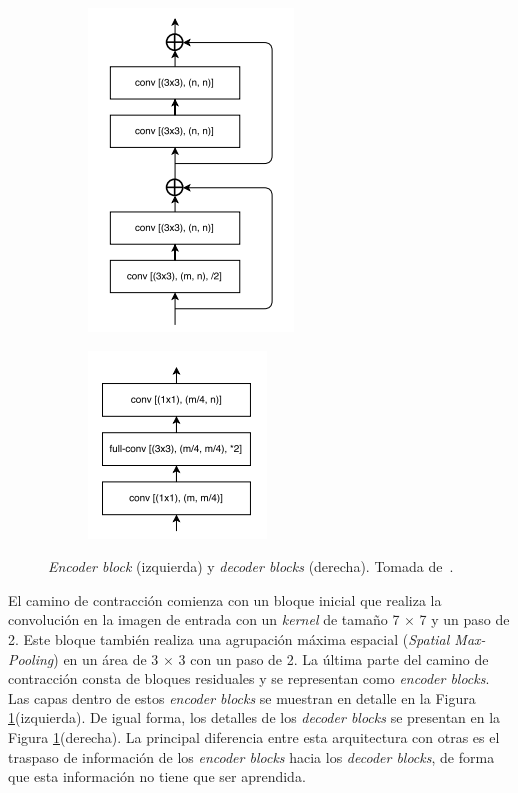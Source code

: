 \begin{figure}[ht]
	\centering
	\begin{subfigure}
		\centering
		\includegraphics[width=.4\linewidth]{./Graphics/encoder.png}
	\end{subfigure}
	\begin{subfigure}
		\centering
		\includegraphics[width=.4\linewidth]{./Graphics/decoder.png}
	\end{subfigure}
	\caption{\textit{Encoder block} (izquierda) y \textit{decoder blocks} (derecha). Tomada de~\cite{chaurasia2017linknet}.}
	\label{fig:blocks}
\end{figure}

El camino de contracción comienza con un bloque inicial que realiza la convolución en la imagen de entrada con un \textit{kernel} de tamaño 7 $\times$ 7 y un paso de 2. Este bloque también realiza una agrupación máxima espacial (\textit{Spatial Max-Pooling}) en un área de 3 $\times$ 3 con un paso de 2. La última parte del camino de contracción consta de bloques residuales y se representan como \textit{encoder blocks}. Las capas dentro de estos \textit{encoder blocks} se muestran en detalle en la Figura \ref{fig:blocks}(izquierda). De igual forma, los detalles de los \textit{decoder blocks} se presentan en la Figura \ref{fig:blocks}(derecha). La principal diferencia entre esta arquitectura con otras es el traspaso de información de los \textit{encoder blocks} hacia los \textit{decoder blocks}, de forma que esta información no tiene que ser aprendida.

